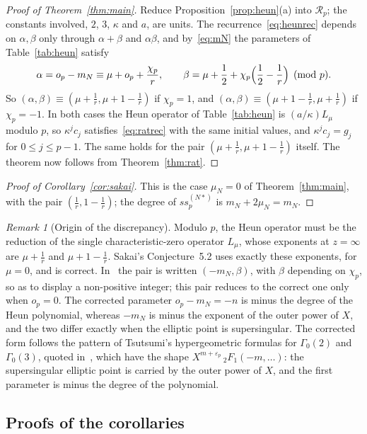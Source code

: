 \documentclass[11pt,a4paper]{article}
\theoremstyle{definition}
\theoremstyle{remark}
\newtheorem{remark}[theorem]{Remark}
\newcommand{\ssp}{\mathit{ss}_p}
\numberwithin{equation}{section}
\begin{document}
\begin{proof}[Proof of Theorem~\ref{thm:main}]
Reduce Proposition~\ref{prop:heun}(a) into $\mathcal R_p$; the constants
involved, $2$, $3$, $\kappa$ and $a$, are units. The
recurrence~\eqref{eq:heunrec} depends on $\alpha,\beta$ only through
$\alpha+\beta$ and $\alpha\beta$, and by~\eqref{eq:mN} the parameters of
Table~\ref{tab:heun} satisfy
\[
\alpha=o_p-m_N\equiv\mu+o_p+\frac{\chi_p}{r},\qquad
\beta=\mu+\frac12+\chi_p\Bigl(\frac12-\frac1r\Bigr)\pmod p .
\]
So $(\alpha,\beta)\equiv(\mu+\frac1r,\mu+1-\frac1r)$ if $\chi_p=1$, and
$(\alpha,\beta)\equiv(\mu+1-\frac1r,\mu+\frac1r)$ if $\chi_p=-1$. In both
cases the Heun operator of Table~\ref{tab:heun} is $(a/\kappa)L_\mu$ modulo
$p$, so $\kappa^jc_j$ satisfies~\eqref{eq:ratrec} with the same initial
values, and $\kappa^jc_j=g_j$ for $0\le j\le p-1$. The same holds for the pair
$(\mu+\frac1r,\mu+1-\frac1r)$ itself. The theorem now follows from
Theorem~\ref{thm:rat}.
\end{proof}

\begin{proof}[Proof of Corollary~\ref{cor:sakai}]
This is the case $\mu_N=0$ of Theorem~\ref{thm:main}, with the pair
$(\frac1r,1-\frac1r)$; the degree of $\ssp^{(N*)}$ is $m_N+2\mu_N=m_N$.
\end{proof}

\begin{remark}[Origin of the discrepancy]\label{rem:typo}
Modulo $p$, the Heun operator must be the reduction of the single
characteristic-zero operator $L_\mu$, whose exponents at $z=\infty$ are
$\mu+\frac1r$ and $\mu+1-\frac1r$. Sakai's Conjecture~5.2 uses exactly these
exponents, for $\mu=0$, and is correct. In~\cite[Conjecture~1]{Nakaya19} the
pair is written $(-m_N,\beta)$, with $\beta$ depending on $\chi_p$, so as to
display a non-positive integer; this pair reduces to the correct one only when
$o_p=0$. The corrected parameter $o_p-m_N=-n$ is minus the degree of the Heun
polynomial, whereas $-m_N$ is minus the exponent of the outer power of $X$,
and the two differ exactly when the elliptic point is supersingular. The
corrected form follows the pattern of Tsutsumi's hypergeometric formulas for
$\Gamma_0(2)$ and $\Gamma_0(3)$, quoted in~\cite[Proposition~1]{Nakaya19},
which have the shape $X^{m+\varepsilon_p}\,{}_2F_1(-m,\ldots)$: the
supersingular elliptic point is carried by the outer power of $X$, and the
first parameter is minus the degree of the polynomial.
\end{remark}

\subsection{Proofs of the corollaries}
\end{document}
